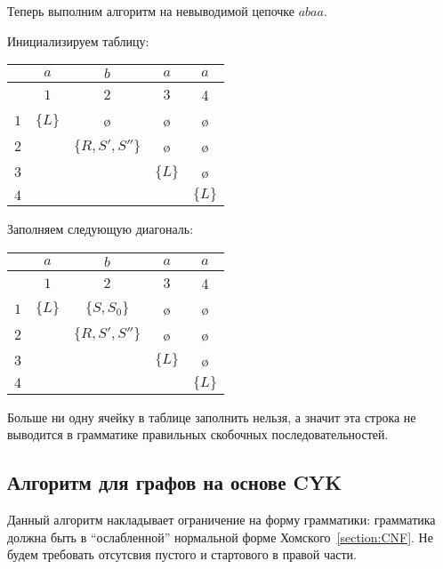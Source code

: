 \begin{example}
  Теперь выполним алгоритм на невыводимой цепочке $abaa$. 

  Инициализируем таблицу:

  \begin{center}
    \begin{tabular}{c||cc|cc}
      & $a$ & $b$ & $a$ & $a$ \\ \hline
      & $1$ & $2$ & $3$ & 4 \\ \hline \hline 
    $1$ & $\{L\}$ & \o & \o & \o \\ 
    $2$ &   & $\{R, S', S''\}$ & \o & \o \\ 
    $3$ &   &   & $\{L\}$ & \o \\ \hline
    $4$ &   &   &   & $\{L\}$ \\ 
    \end{tabular}
  \end{center}

  Заполняем следующую диагональ: 

  \begin{center}
    \begin{tabular}{c||cc|cc}
      & $a$ & $b$ & $a$ & $a$ \\ \hline
      & $1$ & $2$ & $3$ & 4 \\ \hline \hline 
    $1$ & $\{L\}$ & $\{S, S_0\}$ & \o & \o \\ 
    $2$ &   & $\{R, S', S''\}$ & \o & \o \\ 
    $3$ &   &   & $\{L\}$ & \o \\ \hline
    $4$ &   &   &   & $\{L\}$ \\ 
    \end{tabular}
  \end{center}


  Больше ни одну ячейку в таблице заполнить нельзя, а значит эта строка не выводится в грамматике правильных скобочных последовательностей. 

\end{example}

\subsection{Алгоритм для графов на основе CYK}

Данный алгоритм накладывает ограничение на форму грамматики: грамматика должна быть в ``ослабленной'' нормальной форме Хомского~\ref{section:CNF}.
Не будем требовать отсутсвия пустого и стартового в правой части.

